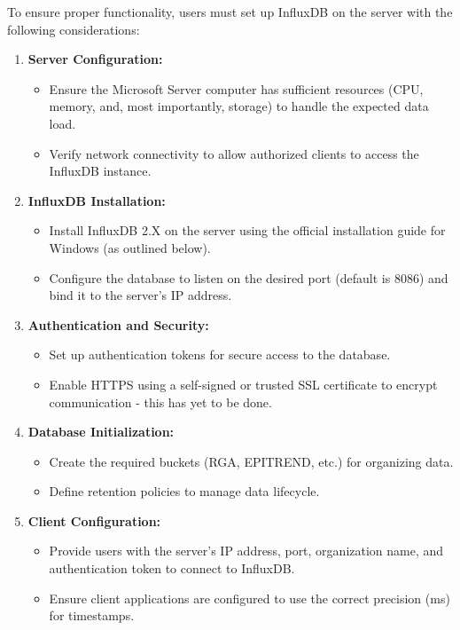 \documentclass{article}
\begin{document}
\vspace{10pt}
\noindent
To ensure proper functionality, users must set up InfluxDB on the server with the following considerations:

\begin{enumerate}
    \item \textbf{Server Configuration:}
    \begin{itemize}
        \item Ensure the Microsoft Server computer has sufficient resources (CPU, memory, and, most importantly, storage) to handle the expected data load.
        \item Verify network connectivity to allow authorized clients to access the InfluxDB instance.
    \end{itemize}
    \item \textbf{InfluxDB Installation:}
    \begin{itemize}
        \item Install InfluxDB 2.X on the server using the official installation guide for Windows (as outlined below).
        \item Configure the database to listen on the desired port (default is 8086) and bind it to the server's IP address.
    \end{itemize}
    \item \textbf{Authentication and Security:}
    \begin{itemize}
        \item Set up authentication tokens for secure access to the database.
        \item Enable HTTPS using a self-signed or trusted SSL certificate to encrypt communication - this has yet to be done.
    \end{itemize}
    \item \textbf{Database Initialization:}
    \begin{itemize}
        \item Create the required buckets (RGA, EPITREND, etc.) for organizing data.
        \item Define retention policies to manage data lifecycle.
    \end{itemize}
    \item \textbf{Client Configuration:}
    \begin{itemize}
        \item Provide users with the server's IP address, port, organization name, and authentication token to connect to InfluxDB.
        \item Ensure client applications are configured to use the correct precision (ms) for timestamps.
    \end{itemize}
\end{enumerate}
\end{document}

